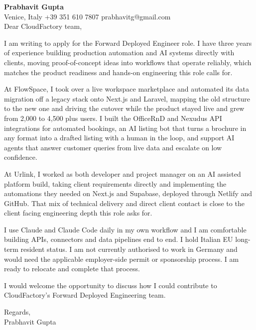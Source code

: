 \documentclass[a4paper,10.5pt]{article}
\begin{document}
\textbf{Prabhavit Gupta}\\
Venice, Italy \textbar{} +39 351 610 7807 \textbar{} prabhavitg@gmail.com\\[10pt]
Dear CloudFactory team,

I am writing to apply for the Forward Deployed Engineer role. I have three years of experience building production automation and AI systems directly with clients, moving proof-of-concept ideas into workflows that operate reliably, which matches the product readiness and hands-on engineering this role calls for.

At FlowSpace, I took over a live workspace marketplace and automated its data migration off a legacy stack onto Next.js and Laravel, mapping the old structure to the new one and driving the cutover while the product stayed live and grew from 2,000 to 4,500 plus users. I built the OfficeRnD and Nexudus API integrations for automated bookings, an AI listing bot that turns a brochure in any format into a drafted listing with a human in the loop, and support AI agents that answer customer queries from live data and escalate on low confidence.

At Urlink, I worked as both developer and project manager on an AI assisted platform build, taking client requirements directly and implementing the automations they needed on Next.js and Supabase, deployed through Netlify and GitHub. That mix of technical delivery and direct client contact is close to the client facing engineering depth this role asks for.

I use Claude and Claude Code daily in my own workflow and I am comfortable building APIs, connectors and data pipelines end to end. I hold Italian EU long-term resident status. I am not currently authorised to work in Germany and would need the applicable employer-side permit or sponsorship process. I am ready to relocate and complete that process.

I would welcome the opportunity to discuss how I could contribute to CloudFactory's Forward Deployed Engineering team.

Regards,\\
Prabhavit Gupta
\end{document}
